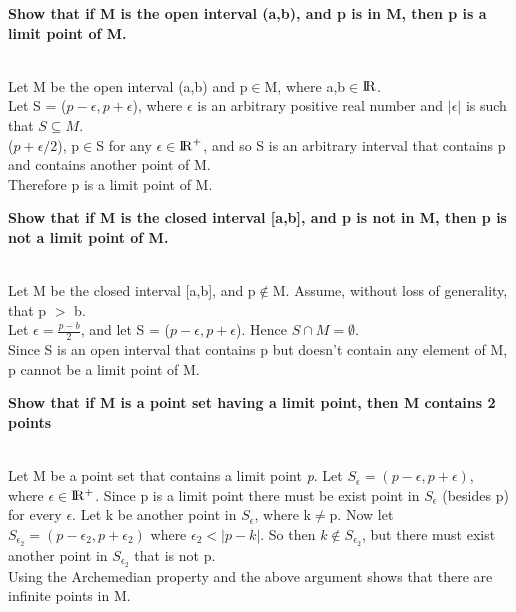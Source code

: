 \documentclass[answers]{exam}
\begin{document}

\begin{questions}
\question
   \textbf{ Show that if M is the open interval (a,b), and p is in M, then p is a limit point of M.}

\begin{solution}\\
   Let M be the open interval (a,b) and p$\in$M, where a,b$\in$${\rm I\!R}$. \\
  Let S = ($p-\epsilon, p+\epsilon$), where $\epsilon$ is an arbitrary positive real number and $|\epsilon|$ is such that $S \subseteq M$. \\
($p+\epsilon / 2$), p$\in$S for any $\epsilon$$\in$${\rm I\!R}^+$, and so S is an arbitrary interval that contains p and contains another point of M. \\
Therefore p is a limit point of M.
\end{solution}


\question

\textbf{Show that if M is the closed interval [a,b], and p is not in M, then p is not a limit point of M.}

\begin{solution}\\
    Let M be the closed interval [a,b], and p$\notin$M. Assume, without loss of generality, that p $>$ b.\\ 
Let $\epsilon = \frac{p-b}{2}$, and let S = ($p-\epsilon, p+\epsilon$). Hence $S \cap M = \emptyset$. \\ 
Since S is an open interval that contains p but doesn't contain any element of M, p cannot be a limit point of M.
\end{solution}



\question

\textbf{Show that if M is a point set having a limit point, then M contains 2 points}

\begin{solution}\\
   Let M be a point set that contains a limit point \textit{p}. Let $S_\epsilon= (p-\epsilon,p+\epsilon)$, where $\epsilon\in$${\rm I\!R^+}$.
Since p is a limit point there must be exist point in $S_\epsilon$ (besides p) for every $\epsilon$. Let k be another point in $S_\epsilon$, where k$\neq$p.
Now let $S_{\epsilon_2}= (p-\epsilon_2,p+\epsilon_2)$ where $\epsilon_2< |p-k|$. So then $k\notin S_{\epsilon_2}$, but there must exist another point in $S_{\epsilon_2}$
that is not p. \\
Using the Archemedian property and the above argument shows that there are infinite points in M.
\end{solution}

\end{questions}
\end{document}
